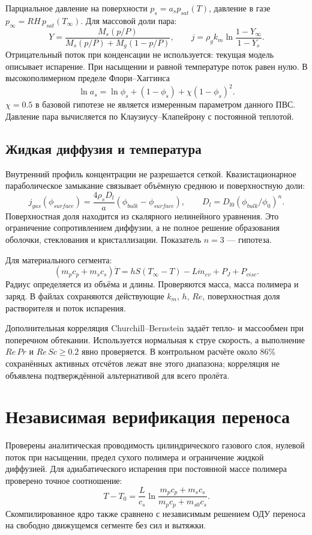 \documentclass[12pt,a4paper]{article}
\begin{document}
Парциальное давление на поверхности $p_s=a_s p_{sat}(T)$, давление в газе
$p_\infty=RH\,p_{sat}(T_\infty)$. Для массовой доли пара:
\[
 Y=\frac{M_s(p/P)}{M_s(p/P)+M_g(1-p/P)},\qquad
 j=\rho_g k_m\ln\frac{1-Y_\infty}{1-Y_s}.
\]
Отрицательный поток при конденсации не используется: текущая модель
описывает испарение. При насыщении и равной температуре поток равен нулю.
В высокополимерном пределе Флори--Хаггинса
\[
 \ln a_s=\ln\phi_s+(1-\phi_s)+\chi(1-\phi_s)^2.
\]
$\chi=0.5$ в базовой гипотезе не является измеренным параметром данного ПВС.
Давление пара вычисляется по Клаузиусу--Клапейрону с постоянной теплотой.

\subsection{Жидкая диффузия и температура}
Внутренний профиль концентрации не разрешается сеткой. Квазистационарное
параболическое замыкание связывает объёмную среднюю и поверхностную доли:
\[
 j_{gas}(\phi_{surface})=\frac{4\rho_s D_l}{a}
 (\phi_{bulk}-\phi_{surface}),\qquad
 D_l=D_{l0}(\phi_{bulk}/\phi_0)^n.
\]
Поверхностная доля находится из скалярного нелинейного уравнения. Это
ограничение сопротивлением диффузии, а не полное решение образования
оболочки, стеклования и кристаллизации. Показатель $n=3$ — гипотеза.

Для материального сегмента:
\[
 (m_p c_p+m_s c_s)\dot T=hS(T_\infty-T)-L\dot m_{ev}+P_J+P_{visc}.
\]
Радиус определяется из объёма и длины. Проверяются масса, масса полимера
и заряд. В файлах сохраняются действующие $k_m$, $h$, $Re$, поверхностная
доля растворителя и поток испарения.

Дополнительная корреляция Churchill--Bernstein задаёт тепло- и массообмен
при поперечном обтекании. Используется нормальная к струе скорость, а
выполнение $Re\,Pr$ и $Re\,Sc\geq0.2$ явно проверяется. В контрольном
расчёте около 86\% сохранённых активных отсчётов лежат вне этого диапазона;
корреляция не объявлена подтверждённой альтернативой для всего пролёта.

\section{Независимая верификация переноса}
Проверены аналитическая проводимость цилиндрического газового слоя,
нулевой поток при насыщении, предел сухого полимера и ограничение жидкой
диффузией. Для адиабатического испарения при постоянной массе полимера
проверено точное соотношение:
\[
 T-T_0=\frac{L}{c_s}\ln\frac{m_pc_p+m_sc_s}{m_pc_p+m_{s0}c_s}.
\]
Скомпилированное ядро также сравнено с независимым решением ОДУ переноса
на свободно движущемся сегменте без сил и вытяжки.
\end{document}
